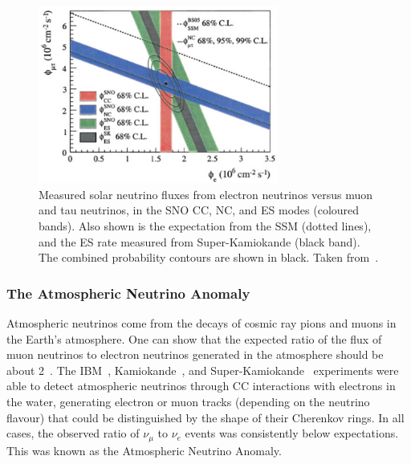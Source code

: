 \begin{figure}
    \centering
    \includegraphics[width=0.7\textwidth]{1_NeutrinoTheory/Figs/sno_vs_ssm_comparison.png}
    \caption[Comparison of measured solar neutrino fluxes in the SNO CC, NC, and ES modes to the SSM]
    {Measured solar neutrino fluxes from electron neutrinos versus muon and tau neutrinos, in the SNO CC, NC, and ES modes (coloured bands). Also shown is the expectation from the SSM (dotted lines), and the ES rate measured from Super-Kamiokande (black band). The combined probability contours are shown in black. Taken from~\cite{aharmimElectronEnergySpectra2005}.}
    \label{fig:sno_flux_results}
\end{figure}


\subsubsection{The Atmospheric Neutrino Anomaly}
Atmospheric neutrinos come from the decays of cosmic ray pions and muons in the Earth's atmosphere. One can show that the expected ratio of the flux of muon neutrinos to electron neutrinos generated in the atmosphere should be about 2~\cite{fukudaEvidenceOscillationAtmospheric1998}. %
The IBM~\cite{becker-szendyElectronMuonneutrinoContent1992}, %
Kamiokande~\cite{fukudaAtmosphericVmveRatio1994}, %
and Super-Kamiokande~\cite{fukudaEvidenceOscillationAtmospheric1998} %
experiments were able to detect atmospheric neutrinos through CC interactions with electrons in the water, generating electron or muon tracks (depending on the neutrino flavour) that could be distinguished by the shape of their Cherenkov rings. In all cases, the observed ratio of $\nu_{\mu}$ to $\nu_{e}$ events was consistently below expectations. This was known as the Atmospheric Neutrino Anomaly.

